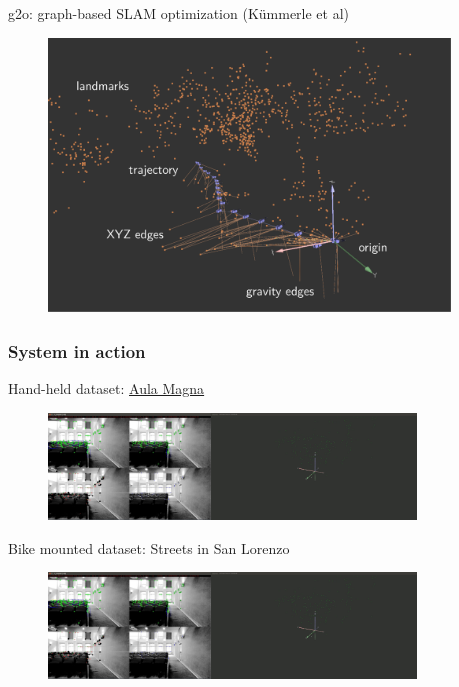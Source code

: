 \documentclass[11pt]{beamer}
\begin{document}
\begin{frame}{g2o: graph-based SLAM optimization (Kümmerle et al)}
\begin{figure}[!htb]
\centering
\includegraphics[width=0.95\textwidth]{figures/introduction/g2o_viewer.pdf}
\end{figure}
\end{frame}

\begin{frame}
\frametitle{System in action}
Hand-held dataset: \href{run:/home/n551jw/Documents/presentation_ma/aula_magna.ogv}{Aula Magna}
\begin{figure}[!htb]
\centering
\includegraphics[width=0.87\textwidth]{figures/movie_aula_magna.png}
\end{figure}
Bike mounted dataset: Streets in San Lorenzo
\begin{figure}[!htb]
\centering
\includegraphics[width=0.87\textwidth]{figures/movie_aula_magna.png}
\end{figure}
\end{frame}
\end{document}
